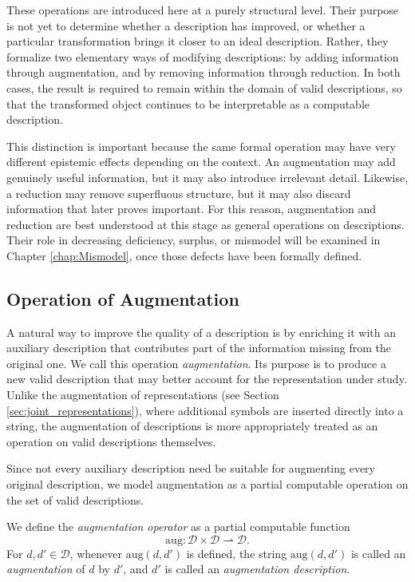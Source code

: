 These operations are introduced here at a purely structural level. Their purpose is not yet to determine whether a description has improved, or whether a particular transformation brings it closer to an ideal description. Rather, they formalize two elementary ways of modifying descriptions: by adding information through augmentation, and by removing information through reduction. In both cases, the result is required to remain within the domain of valid descriptions, so that the transformed object continues to be interpretable as a computable description.

This distinction is important because the same formal operation may have very different epistemic effects depending on the context. An augmentation may add genuinely useful information, but it may also introduce irrelevant detail. Likewise, a reduction may remove superfluous structure, but it may also discard information that later proves important. For this reason, augmentation and reduction are best understood at this stage as general operations on descriptions. Their role in decreasing deficiency, surplus, or mismodel will be examined in Chapter \ref{chap:Mismodel}, once those defects have been formally defined.



\subsection*{Operation of Augmentation}

A natural way to improve the quality of a description is by enriching it with an auxiliary description that contributes part of the information missing from the original one. We call this operation \emph{augmentation}. Its purpose is to produce a new valid description that may better account for the representation under study. Unlike the augmentation of representations (see Section \ref{sec:joint_representations}), where additional symbols are inserted directly into a string, the augmentation of descriptions is more appropriately treated as an operation on valid descriptions themselves.

Since not every auxiliary description need be suitable for augmenting every original description, we model augmentation as a partial computable operation on the set of valid descriptions.

\begin{definition}
We define the \emph{augmentation operator} as a partial computable function
\[
\mathrm{aug} : \mathcal{D} \times \mathcal{D} \rightharpoonup \mathcal{D}.
\]
For $d, d' \in \mathcal{D}$, whenever $\mathrm{aug}(d, d')$ is defined, the string $\mathrm{aug}(d, d')$ is called an \emph{augmentation} of $d$ by $d'$, and $d'$ is called an \emph{augmentation description}.
\end{definition}

